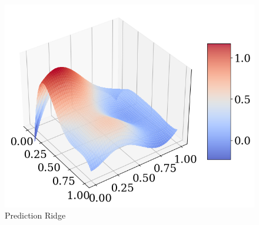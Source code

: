 \documentclass[twoside,11pt]{report}
\begin{document}
\begin{figure}[h]
\begin{minipage}[t]{.48\linewidth}
\begin{center}
        \includegraphics[width=1.0\textwidth]{../runsAndAdditions/predictionRidge.png}
        \caption{Prediction Ridge}\label{fig:predictionRidge}
    \end{center}
\end{minipage}
\end{figure}
\end{document}
